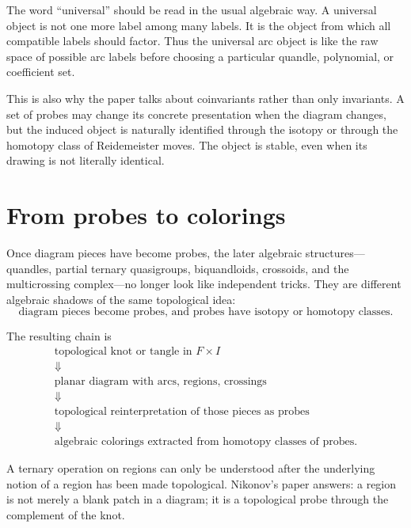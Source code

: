 \begin{remark}
The word ``universal'' should be read in the usual algebraic way.  A universal object is not one more label among many labels.  It is the object from which all compatible labels should factor.  Thus the universal arc object is like the raw space of possible arc labels before choosing a particular quandle, polynomial, or coefficient set.
\end{remark}

This is also why the paper talks about coinvariants rather than only invariants.  A set of probes may change its concrete presentation when the diagram changes, but the induced object is naturally identified through the isotopy or through the homotopy class of Reidemeister moves.  The object is stable, even when its drawing is not literally identical.

\section{From probes to colorings}

Once diagram pieces have become probes, the later algebraic structures---quandles, partial ternary quasigroups, biquandloids, crossoids, and the multicrossing complex---no longer look like independent tricks.  They are different algebraic shadows of the same topological idea:
\[
  \text{diagram pieces become probes, and probes have isotopy or homotopy classes.}
\]

The resulting chain is
\[
\begin{array}{c}
\text{topological knot or tangle in }F\times I\\
\Downarrow\\
\text{planar diagram with arcs, regions, crossings}\\
\Downarrow\\
\text{topological reinterpretation of those pieces as probes}\\
\Downarrow\\
\text{algebraic colorings extracted from homotopy classes of probes.}
\end{array}
\]

A ternary operation on regions can only be understood after the underlying notion of a region has been made topological.  Nikonov's paper answers: a region is not merely a blank patch in a diagram; it is a topological probe through the complement of the knot.
